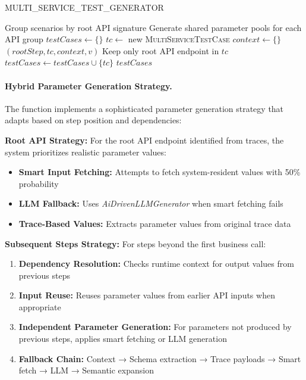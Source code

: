 \documentclass[conference]{IEEEtran}
\begin{document}
\begin{algorithm}[tb]
\caption{MULTI\_SERVICE\_TEST\_GENERATOR}\label{alg:generate}
\footnotesize
\begin{algorithmic}[1]
\Require{}
\Ensure{}
\State Group scenarios by root API signature
\State Generate shared parameter pools for each API group
\State $testCases \gets \{\}$
        \State $tc \gets$ new \textsc{MultiServiceTestCase}
        \State $context \gets \{\}$ 
            \State {}$(rootStep, tc, context, v)$
    \EndFor
            \State Keep only root API endpoint in $tc$
        \EndIf
        \State $testCases \gets testCases \cup \{tc\}$
    \EndFor
\EndFor
\State \Return $testCases$
\end{algorithmic}
\end{algorithm}

\paragraph{Hybrid Parameter Generation Strategy.}
The  function implements a sophisticated parameter generation strategy that adapts based on step position and dependencies:

\textbf{Root API Strategy:} For the root API endpoint identified from traces, the system prioritizes realistic parameter values:
\begin{itemize}[leftmargin=*]
  \item \textbf{Smart Input Fetching:} Attempts to fetch system-resident values with 50\% probability
  \item \textbf{LLM Fallback:} Uses \emph{AiDrivenLLMGenerator} when smart fetching fails
  \item \textbf{Trace-Based Values:} Extracts parameter values from original trace data
\end{itemize}

\textbf{Subsequent Steps Strategy:} For steps beyond the first business call:
\begin{enumerate}[leftmargin=*]
  \item \textbf{Dependency Resolution:} Checks runtime context for output values from previous steps
  \item \textbf{Input Reuse:} Reuses parameter values from earlier API inputs when appropriate
  \item \textbf{Independent Parameter Generation:} For parameters not produced by previous steps, applies smart fetching or LLM generation
  \item \textbf{Fallback Chain:} Context → Schema extraction → Trace payloads → Smart fetch → LLM → Semantic expansion
\end{enumerate}
\end{document}
